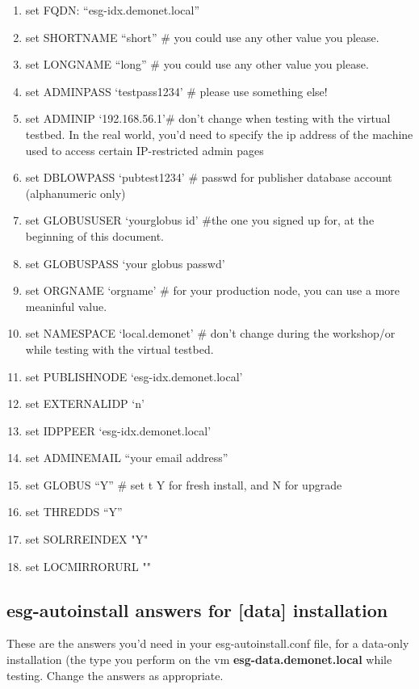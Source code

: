 \begin{enumerate}
\def\labelenumi{\arabic{enumi}.}
\item
  set FQDN: ``esg-idx.demonet.local''
\item
  set SHORTNAME ``short'' \# you could use any other value you please.
\item
  set LONGNAME ``long'' \# you could use any other value you please.
\item
  set ADMINPASS `testpass1234' \# please use something else!
\item
  set ADMINIP `192.168.56.1'\# don't change when testing with the virtual testbed. In the real world, you'd need to specify the ip address of the machine used to access certain IP-restricted admin pages
\item
  set DBLOWPASS `pubtest1234' \# passwd for publisher database account
  (alphanumeric only)
\item
  set GLOBUSUSER `yourglobus id' \#the one you signed up for, at the
  beginning of this document.
\item
  set GLOBUSPASS `your globus passwd'
\item
  set ORGNAME `orgname' \# for your production node, you can use a more
  meaninful value.
\item
  set NAMESPACE `local.demonet' \# don't change during the workshop/or while testing with the virtual testbed.
\item
  set PUBLISHNODE `esg-idx.demonet.local'
\item
  set EXTERNALIDP `n'
\item
  set IDPPEER `esg-idx.demonet.local'
\item
  set ADMINEMAIL ``your email address''
\item
  set GLOBUS ``Y'' \# set t Y for fresh install, and N for upgrade
\item
  set THREDDS ``Y''
\item 
  set SOLRREINDEX "Y"
\item 
  set LOCMIRRORURL ""
\end{enumerate}

\subsection{esg-autoinstall answers for [data] installation}

These are the answers you'd need in your esg-autoinstall.conf file, for a data-only installation (the type you perform on the vm \textbf{esg-data.demonet.local} while testing.
Change the answers as appropriate.

